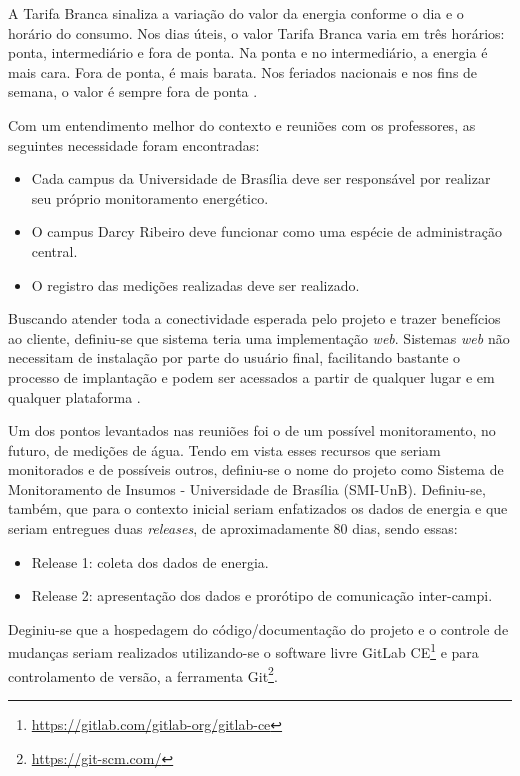 A Tarifa Branca sinaliza a variação do valor da energia conforme o dia e o horário do consumo. Nos dias úteis, o valor Tarifa Branca varia em três horários: ponta, intermediário e fora de ponta. Na ponta e no intermediário, a energia é mais cara. Fora de ponta, é mais barata. Nos feriados nacionais e nos fins de semana, o valor é sempre fora de ponta \cite{aneel}.

Com um entendimento melhor do contexto e reuniões com os professores, as seguintes necessidade foram encontradas:

\begin{itemize}
    \item Cada campus da Universidade de Brasília deve ser responsável por realizar seu próprio monitoramento energético.
    \item O campus Darcy Ribeiro deve funcionar como uma espécie de administração central.
    \item O registro das medições realizadas deve ser realizado.
\end{itemize}

Buscando atender toda a conectividade esperada pelo projeto e trazer benefícios ao cliente, definiu-se que sistema teria uma implementação \textit{web}. Sistemas \textit{web} não necessitam de instalação por parte do usuário final, facilitando bastante o processo de implantação e podem ser acessados a partir de qualquer lugar e em qualquer plataforma \cite{pressman_2009}.

Um dos pontos levantados nas reuniões foi o de um possível monitoramento, no futuro, de medições de água. Tendo em vista esses recursos que seriam monitorados e de possíveis outros, definiu-se o nome do projeto como Sistema de Monitoramento de Insumos - Universidade de Brasília (SMI-UnB). Definiu-se, também, que para o contexto inicial seriam enfatizados os dados de energia e que seriam entregues duas \textit{releases}, de aproximadamente 80 dias, sendo essas:

\begin{itemize}
    \item Release 1: coleta dos dados de energia.
    \item Release 2: apresentação dos dados e prorótipo de comunicação inter-campi.
\end{itemize}

Deginiu-se que a hospedagem do código/documentação do projeto e o controle de mudanças seriam realizados utilizando-se o software livre GitLab CE\footnote{\url{https://gitlab.com/gitlab-org/gitlab-ce}} e para controlamento de versão, a ferramenta Git\footnote{\url{https://git-scm.com/}}.

